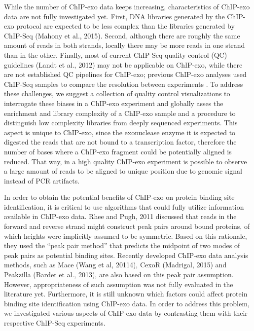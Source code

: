 \documentclass{bmcart}\usepackage[]{graphicx}\usepackage[]{color}
\begin{document}

While the number of ChIP-exo data keeps increasing, characteristics of
ChIP-exo data are not fully investigated yet. First, DNA libraries
generated by the ChIP-exo protocol are expected to be less complex than the
libraries generated by ChIP-Seq (Mahony et al.,
2015\nocite{exo_review}). Second, although there are roughly the same
amount of reads in both strands, locally there may be more reads in
one strand than in the other. Finally, most of current ChIP-Seq
quality control (QC) guidelines (Landt et al., 2012\nocite{encode_qc})
may not be applicable on ChIP-exo, while there are not established QC
pipelines for ChIP-exo; previous ChIP-exo analyses used ChIP-Seq
samples to compare the resolution between experiments
\cite{exo1,exoillumina,exo2}. To address these challenges, we suggest
a collection of quality control visualizations to interrogate these
biases in a ChIP-exo experiment and globally asses the enrichment and
library complexity of a ChIP-exo sample and a procedure to distinguish
low complexity libraries from deeply sequenced experiments. This
aspect is unique to ChIP-exo, since the exonuclease enzyme it is
expected to digested the reads that are not bound to a transcription
factor, therefore the number of bases where a ChIP-exo fragment could
be potentially aligned is reduced. That way, in a high quality
ChIP-exo experiment is possible to observe a large amount of reads to
be aligned to unique position due to genomic signal instead of PCR
artifacts.

In order to obtain the potential benefits of ChIP-exo on protein
binding site identification, it is critical to use algorithms that
could fully utilize information available in ChIP-exo data. Rhee and
Pugh, 2011 \nocite{exo1} discussed that reads in the forward and reverse
strand might construct peak pairs around bound proteins, of which
heights were implicitly assumed to be symmetric. Based on this
rationale, they used the ``peak pair method'' that predicts the
midpoint of two modes of peak pairs as potential binding
sites. Recently developed ChIP-exo data analysis methods, such as Mace
(Wang et al, 20114\nocite{mace}), CexoR (Madrigal, 2015\nocite{cexor})
and Peakzilla (Bardet et al., 2013\nocite{peakzilla}), are also based
on this peak pair assumption. However, appropriateness of such
assumption was not fully evaluated in the literature yet. Furthermore,
it is still unknown which factors could affect protein binding site
identification using ChIP-exo data. In order to address this problem,
we investigated various aspects of ChIP-exo data by contrasting them
with their respective ChIP-Seq experiments.
\end{document}
